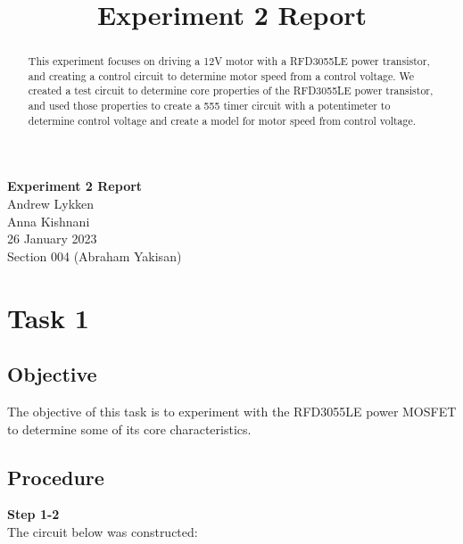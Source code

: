 \documentclass[notitlepage, 12pt]{report}  %
\title{Experiment 2 Report}
\begin{document}


\begin{center}
\large \textbf{Experiment 2 Report} \\ %
\small 
Andrew Lykken\\
Anna Kishnani\\
26 January 2023\\
Section 004 (Abraham Yakisan)\\

\end{center}

\vspace{4in}


\begin{abstract}
This experiment focuses on driving a 12V motor with a RFD3055LE power transistor, and creating a control circuit to 
determine motor speed from a control voltage. We created a test circuit to determine core properties of the RFD3055LE 
power transistor, and used those properties to create a 555 timer circuit with a potentimeter to determine control 
voltage and create a model for motor speed from control voltage.  
\end{abstract}

\newpage

\section*{Task 1} %


\subsection*{Objective}
\indent\indent The objective of this task is to experiment with the RFD3055LE power MOSFET to determine some 
of its core characteristics.

\subsection*{Procedure}
\indent\indent \textbf{Step 1-2}\\
The circuit below was constructed:
\end{document}
